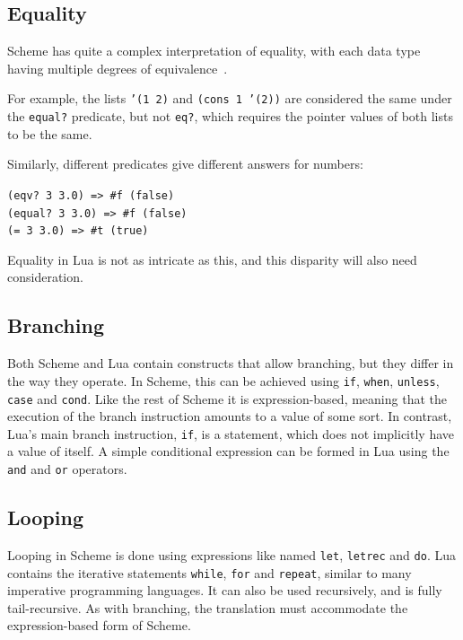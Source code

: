 \subsection{Equality}

Scheme has quite a complex interpretation of equality, with each data type
having multiple degrees of equivalence~\cite[Sec~6.2]{tspl}.
\begin{framed}
For example, the lists \texttt{'(1 2)} and \texttt{(cons 1 '(2))} are considered
the same under the \texttt{equal?} predicate, but not \texttt{eq?}, which
requires the pointer values of both lists to be the same.

Similarly, different predicates give different answers for numbers:
\begin{center}
\ttfamily
\verb|(eqv? 3 3.0) => #f (false)| \\
\verb|(equal? 3 3.0) => #f (false)| \\
\verb|(= 3 3.0) => #t (true)|
\end{center}
\end{framed}
Equality in Lua is not as intricate as this, and this disparity will also need
consideration.

\subsection{Branching}

Both Scheme and Lua contain constructs that allow branching, but they differ in
the way they operate. In Scheme, this can be achieved using \texttt{if},
\texttt{when}, \texttt{unless}, \texttt{case} and \texttt{cond}. Like the rest
of Scheme it is expression-based, meaning that the execution of the branch
instruction amounts to a value of some sort. In contrast, Lua's main branch
instruction, \texttt{if}, is a statement, which does not implicitly have a value
of itself. A simple conditional expression can be formed in Lua using the
\texttt{and} and \texttt{or} operators.

\subsection{Looping}

Looping in Scheme is done using expressions like named \texttt{let},
\texttt{letrec} and \texttt{do}. Lua contains the iterative statements
\texttt{while}, \texttt{for} and \texttt{repeat}, similar to many imperative
programming languages. It can also be used recursively, and is fully
tail-recursive. As with branching, the translation must accommodate the
expression-based form of Scheme.

